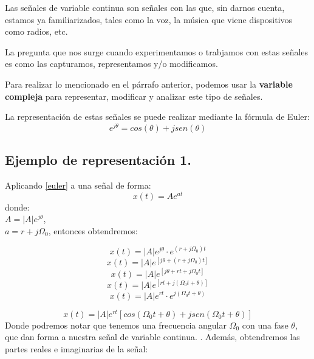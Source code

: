 Las señales de variable continua son señales con las que, sin darnos cuenta, estamos ya familiarizados, tales como la voz, la música que viene dispositivos como radios, etc. \cite{chaparro_signals_2010}

La pregunta que nos surge cuando experimentamos o trabjamos con estas señales es como las capturamos, representamos y/o modificamos.

Para realizar lo mencionado en el párrafo anterior, podemos usar la \textbf{variable compleja} para representar, modificar y analizar este tipo de señales.

La representación de estas señales se puede realizar mediante la fórmula de Euler:
\begin{equation}
    e^{j\theta} = cos(\theta)+jsen(\theta)
    \label{euler}
\end{equation}

\subsection{Ejemplo de representación 1.}
Aplicando  \ref{euler} a una señal de forma:
\begin{equation*}
    x(t) = Ae^{at}
\end{equation*}
donde:\\
$A = |A|e^{j\theta}$,\\
$a = r+j\Omega_0$,
entonces obtendremos:

\begin{equation*}
    x(t) = |A|e^{j\theta} \cdot e^{(r+j\Omega_0)t}
\end{equation*}
\begin{equation*}
    x(t) = |A|e^{[j\theta + (r+j\Omega_0)t]}
\end{equation*}
\begin{equation*}
    x(t) = |A|e^{[j\theta+rt+j\Omega_0 t]}
\end{equation*}
\begin{equation*}
    x(t) = |A|e^{[rt+j(\Omega_0 t+\theta)]}
\end{equation*}
\begin{equation*}
    x(t) = |A|e^{rt}\cdot e^{j(\Omega_0 t +\theta)}
\end{equation*}

\begin{equation}
    x(t) = |A|e^{rt} [cos(\Omega_0 t +\theta)+jsen(\Omega_0 t +\theta)]
\end{equation}
Donde podremos notar que tenemos una frecuencia angular $\Omega_0$ con una fase $\theta$, que dan forma a nuestra señal de variable continua. \cite{tarrio_ondas_nodate}.
Además, obtendremos las partes reales e imaginarias de la señal:

